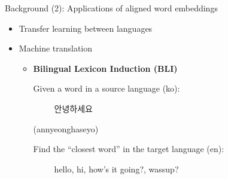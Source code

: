 \documentclass{beamer}
\begin{document}
\begin{frame}{Background (2): Applications of aligned word embeddings}
    \begin{itemize}
        \item Transfer learning between languages


            \vspace{0.3in}

        \item Machine translation
            
            \vspace{0.15in}
            \begin{itemize}
                \item
                    \pause \textbf{Bilingual Lexicon Induction (BLI)}

            \vspace{0.2in}
            Given a word in a source language (ko):

            \vspace{0.15in}
            \begin{CJK}{UTF8}{mj}
            ~~~~~안녕하세요
            \end{CJK} (annyeonghaseyo)


            \vspace{0.15in}
            Find the ``closest word'' in the target language (en):

            \vspace{0.15in}
            ~~~~~hello, hi, how's it going?, wassup?
            \end{itemize}
%
    \end{itemize}
\end{frame}

\end{document}
